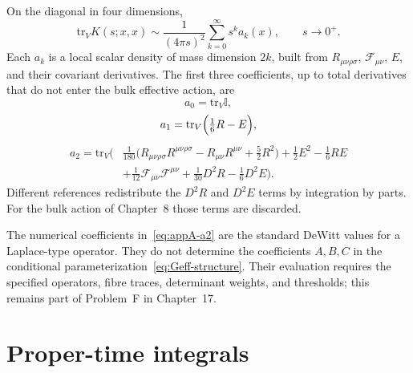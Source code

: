 On the diagonal in four dimensions,
\begin{equation}
  \label{eq:appA-SDW}
  \mathrm{tr}_V K(s;x,x)
  \sim
  \frac{1}{(4\pi s)^{2}}
  \sum_{k=0}^{\infty}
  s^k a_k(x),
  \qquad
  s\to 0^+.
\end{equation}
Each \(a_k\) is a local scalar density of mass dimension \(2k\),
built from \(R_{\mu\nu\rho\sigma}\), \(\mathcal{F}_{\mu\nu}\),
\(E\), and their covariant derivatives. The first three
coefficients, up to total derivatives that do not enter the bulk
effective action, are
\begin{equation}
  \label{eq:appA-a0}
  a_0=\mathrm{tr}_V\mathbb{I},
\end{equation}
\begin{equation}
  \label{eq:appA-a1}
  a_1
  =\mathrm{tr}_V
   \Bigl(
     \tfrac16 R-E
   \Bigr),
\end{equation}
\begin{equation}
  \label{eq:appA-a2}
  \begin{aligned}
    a_2
    =\mathrm{tr}_V
     \Biggl(
       &\frac{1}{180}
        \bigl(
          R_{\mu\nu\rho\sigma}R^{\mu\nu\rho\sigma}
          -R_{\mu\nu}R^{\mu\nu}
          +\tfrac52 R^2
        \bigr)
        +\frac12 E^2
        -\frac16 RE\\
       &+\frac{1}{12}\mathcal{F}_{\mu\nu}\mathcal{F}^{\mu\nu}
        +\frac{1}{30}D^2 R
        -\frac16 D^2 E
     \Biggr).
  \end{aligned}
\end{equation}
Different references redistribute the \(D^2 R\) and \(D^2 E\) terms
by integration by parts. For the bulk action of Chapter~8 those
terms are discarded.

The numerical coefficients in~\eqref{eq:appA-a2} are the standard
DeWitt values for a Laplace-type operator. They do not determine
the coefficients \(A,B,C\) in the conditional
parameterization~\eqref{eq:Geff-structure}. Their evaluation requires
the specified operators, fibre traces, determinant weights, and
thresholds; this remains part of Problem~F in Chapter~17.

\section{Proper-time integrals}
\label{sec:appA-integrals}

